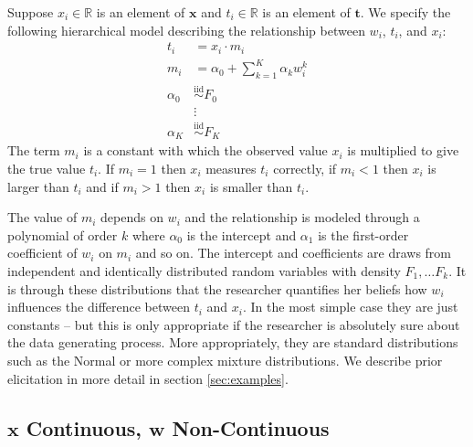 \documentclass[fignum,letterpaper,12pt]{article}
\newcommand{\iid}{\stackrel{\mathrm{iid}}{\sim}}
\begin{document}
Suppose $x_i \in \mathbb{R}$ is an element of $\mathbf{x}$ and $t_i \in \mathbb{R}$ is an element of $\mathbf{t}$. We specify the following hierarchical model describing the relationship between $w_i$, $t_i$, and $x_i$:
\begin{equation}
\begin{array}{rl}
t_i & = x_i \cdot m_i \\
m_i & = \alpha_0 + \sum_{k=1}^{K} \alpha_k w_i^k \\
\alpha_0 & \iid F_0\\
& \vdots \\
\alpha_K & \iid F_K
\end{array}
\end{equation}
The term $m_i$ is a constant with which the observed value $x_i$ is multiplied to give the true value $t_i$. If $m_i=1$ then $x_i$ measures $t_i$ correctly, if $m_i<1$ then $x_i$ is larger than $t_i$ and if $m_i>1$ then $x_i$ is smaller than $t_i$. 

The value of $m_i$ depends on $w_i$ and the relationship is modeled through a polynomial of order $k$ where $\alpha_0$ is the intercept and $\alpha_1$ is the first-order coefficient of $w_i$ on $m_i$ and so on. The intercept and coefficients are draws from independent and identically distributed random variables with density $F_1, \dots F_k$. It is through these distributions that the researcher quantifies her beliefs how $w_i$ influences the difference between $t_i$ and $x_i$. In the most simple case they are just constants -- but this is only appropriate if the researcher is absolutely sure about the data generating process. More appropriately, they are standard distributions such as the Normal or more complex mixture distributions. We describe prior elicitation in more detail in section \ref{sec:examples}.


\subsection{$\mathbf{x}$ Continuous, $\mathbf{w}$ Non-Continuous} \label{subsec:case2}
\end{document}
